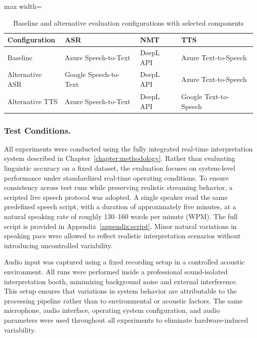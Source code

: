 \begin{table}[!htbp]
  \centering
  \caption[Evaluation configurations and component selection]{Baseline and alternative evaluation configurations with selected components}
      \label{tab:evaluation_configs}
  \begin{adjustbox}{max width=\textwidth}
    \begin{tabular}{p{3cm} p{4cm} p{2cm} p{4cm}}
      \toprule
      \textbf{Configuration} & \textbf{ASR} & \textbf{NMT} & \textbf{TTS} \\
      \midrule
      Baseline & Azure Speech-to-Text & DeepL API & Azure Text-to-Speech \\
      \midrule
      Alternative ASR & Google Speech-to-Text & DeepL API & Azure Text-to-Speech \\
      \midrule
      Alternative TTS & Azure Speech-to-Text & DeepL API & Google Text-to-Speech \\
      \bottomrule
    \end{tabular}
  \end{adjustbox}
\end{table}

\subsubsection{Test Conditions.}
All experiments were conducted using the fully integrated real-time interpretation system described in Chapter~\ref{chapter:methodology}. Rather than evaluating linguistic accuracy on a fixed dataset, the evaluation focuses on system-level performance under standardized real-time operating conditions. To ensure consistency across test runs while preserving realistic streaming behavior, a scripted live speech protocol was adopted. A single speaker read the same predefined speech script, with a duration of approximately five minutes, at a natural speaking rate of roughly 130–160 words per minute (WPM). The full script is provided in Appendix~\ref{appendix:script}. Minor natural variations in speaking pace were allowed to reflect realistic interpretation scenarios without introducing uncontrolled variability.

Audio input was captured using a fixed recording setup in a controlled acoustic environment. All runs were performed inside a professional sound-isolated interpretation booth, minimizing background noise and external interference. This setup ensures that variations in system behavior are attributable to the processing pipeline rather than to environmental or acoustic factors. The same microphone, audio interface, operating system configuration, and audio parameters were used throughout all experiments to eliminate hardware-induced variability.

